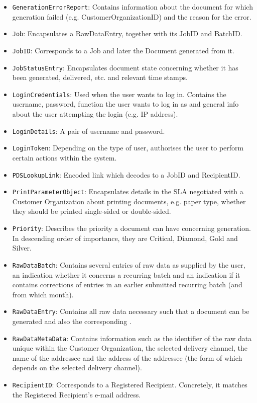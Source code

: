 \begin{itemize}
	\item \texttt{GenerationErrorReport}: Contains information about the document for which generation failed (e.g. CustomerOrganizationID) and the reason for the error.
	\item \texttt{Job}: Encapsulates a RawDataEntry, together with its JobID and BatchID.
	\item \texttt{JobID}: Corresponds to a Job and later the Document generated from it.
	\item \texttt{JobStatusEntry}: Encapsulates document state concerning whether it has been generated, delivered, etc. and relevant time stamps.
	\item \texttt{LoginCredentials}: Used when the user wants to log in. Contains the username, password, function the user wants to log in as and general info about the user attempting the login (e.g. IP address).
	\item \texttt{LoginDetails}: A pair of username and password.
	\item \texttt{LoginToken}: Depending on the type of user, authorises the user to perform certain actions within the system.
	\item \texttt{PDSLookupLink}: Encoded link which decodes to a JobID and RecipientID.
	\item \texttt{PrintParameterObject}: Encapsulates details in the SLA negotiated with a Customer Organization about printing documents, e.g. paper type, whether they should be printed single-sided or double-sided.
	\item \texttt{Priority}: Describes the priority a document can have concerning generation. In descending order of importance, they are Critical, Diamond, Gold and Silver.
	\item \texttt{RawDataBatch}: Contains several entries of raw data as supplied by the user, an indication whether it concerns a recurring batch and an indication if it contains corrections of entries in an earlier submitted recurring batch (and from which month). 
	\item \texttt{RawDataEntry}: Contains all raw data necessary such that a document can be generated and also the corresponding .
	\item \texttt{RawDataMetaData}: Contains information such as the identifier of the raw data unique within the Customer Organization, the selected delivery channel, the name of the addressee and the address of the addressee (the form of which depends on the selected delivery channel).
	\item \texttt{RecipientID}: Corresponds to a Registered Recipient. Concretely, it matches the Registered Recipient's e-mail address.

\end{itemize}
